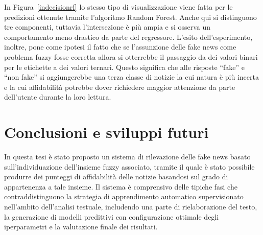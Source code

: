 \documentclass[12pt]{report}
\theoremstyle{definition}
\begin{document}
In Figura~\ref{indecisionrf} lo stesso tipo di visualizzazione viene fatta per le predizioni ottenute tramite l'algoritmo Random Forest. Anche qui si distinguono tre componenti, tuttavia l'intersezione è più ampia e si osserva un comportamento meno drastico da parte del regressore.
L'esito dell'esperimento, inoltre, pone come ipotesi il fatto che se l'assunzione delle fake news come problema fuzzy fosse corretta allora si otterrebbe il passaggio da dei valori binari per le etichette a dei valori ternari. Questo significa che alle risposte ``fake'' e ``non fake'' si aggiungerebbe una terza classe di notizie la cui natura è più incerta e la cui affidabilità potrebbe dover richiedere maggior attenzione da parte dell'utente durante la loro lettura.

\chapter*{Conclusioni e sviluppi futuri}
\onehalfspacing
In questa tesi è stato proposto un sistema di rilevazione delle fake news basato sull'individuazione dell'insieme fuzzy associato, tramite il quale è stato possibile produrre dei punteggi di affidabilità delle notizie basandosi sul grado di appartenenza a tale insieme.
Il sistema è comprensivo delle tipiche fasi che contraddistinguono la strategia di apprendimento automatico supervisionato nell'ambito dell'analisi testuale, includendo una parte di rielaborazione del testo, la generazione di modelli predittivi con configurazione ottimale degli iperparametri e la valutazione finale dei risultati.
\end{document}

